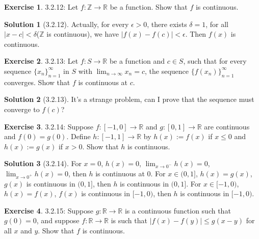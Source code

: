 \documentclass{article}
\theoremstyle{definition}
\newtheorem{exe}{Exercise}[section]
\newtheorem{sol}{Solution}[exe]
\begin{document}
\begin{exe} 3.2.12: Let \( f: \mathbb{Z} \rightarrow \mathbb{R} \) be a function. Show that \( f \) is continuous.

\end{exe} 

\begin{sol}[3.2.12]
    Actually, for every $\epsilon>0$, there exists $\delta=1$, for all $|x-c|<\delta$($\mathbb{Z}$ is continuous), we have $|f(x)-f(c)|<\epsilon$. Then $f(x)$ is continuous.
\end{sol}

\begin{exe} 3.2.13: Let \( f: S \rightarrow \mathbb{R} \) be a function and \( c \in S \), such that for every sequence \( \{x_n\}_{n=1}^{\infty} \) in \( S \) with \( \lim_{n \to \infty} x_n = c \), the sequence \( \{f(x_n)\}_{n=1}^{\infty} \) converges. Show that \( f \) is continuous at \( c \).

\end{exe} 

\begin{sol}[3.2.13]
It's a strange problem, can I prove that the sequence must converge to $f(c)$?
\end{sol}


\begin{exe} 3.2.14: Suppose \( f: [-1,0] \rightarrow \mathbb{R} \) and \( g: [0,1] \rightarrow \mathbb{R} \) are continuous and \( f(0) = g(0) \). Define \( h: [-1,1] \rightarrow \mathbb{R} \) by \( h(x) := f(x) \) if \( x \leq 0 \) and \( h(x) := g(x) \) if \( x > 0 \). Show that \( h \) is continuous.

\end{exe} 

\begin{sol}[3.2.14]
For $x=0$, $h(x)=0$, $\lim_{x\to 0^-} h(x)=0$, $\lim_{x\to 0^+} h(x)=0$, then $h$ is continuous at $0$.
For $x\in(0,1]$, $h(x)=g(x)$, $g(x)$ is continuous in $(0,1]$, then $h$ is continuous in $(0,1]$.
For $x\in[-1,0)$, $h(x)=f(x)$, $f(x)$ is continuous in $[-1,0)$, then $h$ is continuous in $[-1,0)$.
\end{sol}


\begin{exe} 3.2.15: Suppose \( g: \mathbb{R} \rightarrow \mathbb{R} \) is a continuous function such that \( g(0) = 0 \), and suppose \( f: \mathbb{R} \rightarrow \mathbb{R} \) is such that \( |f(x) - f(y)| \leq g(x - y) \) for all \( x \) and \( y \). Show that \( f \) is continuous.
\end{exe}
\end{document}
